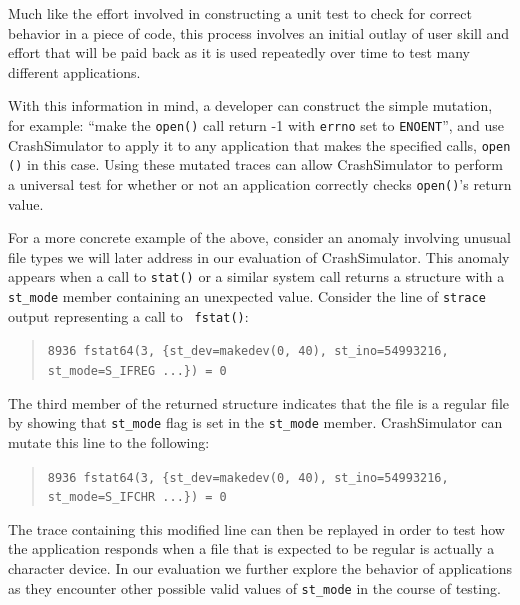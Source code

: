     Much like the effort involved in constructing a unit test to
    check for correct behavior in a piece of code, this
    process involves an initial outlay of user skill and effort that 
    will be paid back as it is used
    repeatedly over time to test many different applications.

    With this information in mind, a developer can construct the simple
    mutation, for example:  ``make the {\tt open()} call return -1 with {\tt errno} set to
    {\tt ENOENT}'', and use CrashSimulator to apply it to any application that
    makes the specified calls, {\tt open ()} in this case.
    Using these mutated traces can allow
    CrashSimulator to perform a universal test for whether or not an
    application correctly checks {\tt open()}'s return value.

    For a more concrete example of the above, consider an anomaly
    involving unusual file types we will later address in our evaluation of
    CrashSimulator.  This anomaly appears when a call to {\tt stat()} or a similar system
    call returns a structure with a {\tt st\_mode} member containing an unexpected
    value. Consider the line of {\tt strace} output representing a call to {\tt
      fstat()}:
    \begin{quote}
      {\tt 8936  fstat64(3, \{st\_dev=makedev(0, 40), st\_ino=54993216, st\_mode=S\_IFREG ...\}) = 0}
    \end{quote}
    The third member of the returned structure indicates that the file is a
    regular file by showing that {\tt st\_mode} flag is set in the {\tt st\_mode}
    member.  CrashSimulator can mutate this  line to the following:

    \begin{quote}
      {\tt 8936  fstat64(3, \{st\_dev=makedev(0, 40), st\_ino=54993216, st\_mode=S\_IFCHR ...\}) = 0}
    \end{quote}
    
    The trace containing this modified line can then be replayed in order to
    test how
    the application responds when a file
    that is expected to be regular is actually a character device. In our
    evaluation we further explore the behavior of applications as they encounter
    other possible valid values of {\tt st\_mode} in the course of testing.


